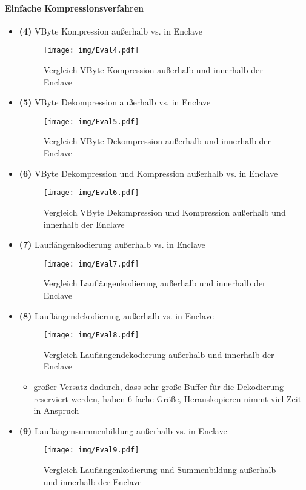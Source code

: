 \paragraph{Einfache Kompressionsverfahren}

\begin{itemize}
	\item \textbf{(4)} VByte Kompression außerhalb vs. in Enclave
	\begin{figure}[h]
		\texttt{[image: img/Eval4.pdf]}
		\centering
		\caption{Vergleich VByte Kompression außerhalb und innerhalb der Enclave}
		\label{fig:eval4}
	\end{figure}
	
	\item \textbf{(5)} VByte Dekompression außerhalb vs. in Enclave
	\begin{figure}[h]
		\texttt{[image: img/Eval5.pdf]}
		\centering
		\caption{Vergleich VByte Dekompression außerhalb und innerhalb der Enclave}
		\label{fig:eval5}
	\end{figure}
	
	\item \textbf{(6)} VByte Dekompression und Kompression außerhalb vs. in Enclave
	\begin{figure}[h]
		\texttt{[image: img/Eval6.pdf]}
		\centering
		\caption{Vergleich VByte Dekompression und Kompression außerhalb und innerhalb der Enclave}
		\label{fig:eval6}
	\end{figure}
	
	\item \textbf{(7)} Lauflängenkodierung außerhalb vs. in Enclave
	\begin{figure}[h]
		\texttt{[image: img/Eval7.pdf]}
		\centering
		\caption{Vergleich Lauflängenkodierung außerhalb und innerhalb der Enclave}
		\label{fig:eval7}
	\end{figure}

	\item \textbf{(8)} Lauflängendekodierung außerhalb vs. in Enclave
	\begin{figure}[h]
		\texttt{[image: img/Eval8.pdf]}
		\centering
		\caption{Vergleich Lauflängendekodierung außerhalb und innerhalb der Enclave}
		\label{fig:eval8}
	\end{figure}

	\begin{itemize}
		\item großer Versatz dadurch, dass sehr große Buffer für die Dekodierung reserviert werden, haben 6-fache Größe, Herauskopieren nimmt viel Zeit in Anspruch
	\end{itemize}

	\item \textbf{(9)} Lauflängensummenbildung außerhalb vs. in Enclave
	\begin{figure}[h]
		\texttt{[image: img/Eval9.pdf]}
		\centering
		\caption{Vergleich Lauflängenkodierung und Summenbildung außerhalb und innerhalb der Enclave}
		\label{fig:eval9}
	\end{figure}

\end{itemize}
